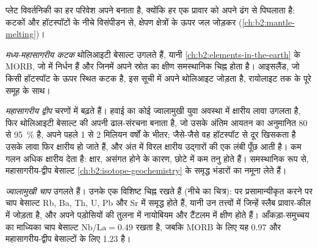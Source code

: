 प्लेट विवर्तनिकी का हर परिवेश अपने  बनाता है, क्योंकि हर एक
प्रावार को अपने ढंग से पिघलाता है: कटकों और हॉटस्पॉटों के नीचे विसंपीडन से, क्षेपण क्षेत्रों के ऊपर
जल जोड़कर (\cref{ch:b2:mantle-melting})।

\emph{मध्य-महासागरीय कटक} थोलिआइटी बेसाल्ट उगलते हैं, यानी
\cref{ch:b2:elements-in-the-earth} के MORB, जो  में निर्धन हैं और जिनमें
अपने स्रोत का क्षीण समस्थानिक चिह्न होता है। आइसलैंड, जो किसी हॉटस्पॉट के ऊपर स्थित कटक है, इस सूची में
अपने थोलिआइट जोड़ता है, रायोलाइट तक के पूरे समूह के साथ।

\emph{महासागरीय द्वीप} चरणों में बढ़ते हैं। हवाई का कोई ज्वालामुखी युवा अवस्था में क्षारीय लावा उगलता है,
फिर थोलिआइटी बेसाल्ट की अपनी ढाल-संरचना बनाता है, जो उसके अंतिम आयतन का अनुमानित 80 से
\qty{95}{\percent} है, अपने पहले 1 से 2 मिलियन वर्षों के भीतर; जैसे-जैसे
वह हॉटस्पॉट से दूर खिसकता है उसके लावा फिर क्षारीय हो जाते हैं, और अंत में
विरल क्षारीय उद्गारों की एक लंबी पूँछ आती है। कम गलन अधिक क्षारीय  देता है: क्षार,
असंगत होने के कारण, छोटे  में कम तनु होते हैं। समस्थानिक रूप से, महासागरीय-द्वीप
बेसाल्ट \cref{ch:b2:isotope-geochemistry} के समृद्ध भंडारों का नमूना लेते हैं।

\emph{ज्वालामुखी चाप}  उगलते हैं। उनके  एक
विशिष्ट चिह्न रखते हैं (नीचे का चित्र):  पर प्रसामान्यीकृत करने पर चाप
बेसाल्ट Rb, Ba, Th, U, Pb और Sr में समृद्ध होते हैं, यानी उन तत्त्वों में जिन्हें स्लैब
प्रावार-कील में जोड़ता है, और अपने पड़ोसियों की तुलना में नायोबियम और टैंटलम में क्षीण होते हैं। आँकड़ा-समुच्चय का माध्यिका
चाप बेसाल्ट $\mathrm{Nb}/\mathrm{La} = 0.49$ रखता है, जबकि MORB के लिए यह 0.97
और महासागरीय-द्वीप बेसाल्टों के लिए 1.23 है।

